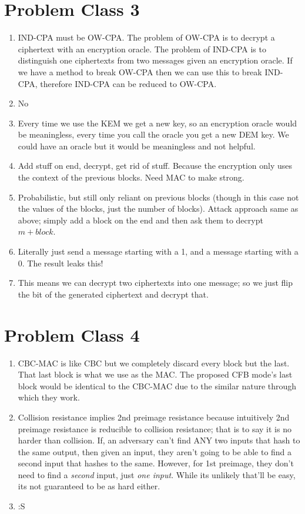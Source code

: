 \section{Problem Class 3}
	\begin{enumerate}
		\item IND-CPA must be OW-CPA. The problem of OW-CPA is to decrypt a ciphertext with an encryption oracle. The problem of IND-CPA is to distinguish one ciphertexts from two messages given an encryption oracle. If we have a method to break OW-CPA then we can use this to break IND-CPA, therefore IND-CPA can be reduced to OW-CPA.
		\item No
		\item Every time we use the KEM we get a new key, so an encryption oracle would be meaningless, every time you call the oracle you get a new DEM key. We could have an oracle but it would be meaningless and not helpful.

		\item Add stuff on end, decrypt, get rid of stuff. Because the encryption only uses the context of the previous blocks. Need MAC to make strong.
		\item Probabilistic, but still only reliant on previous blocks (though in this case not the values of the blocks, just the number of blocks). Attack approach same as above; simply add a block on the end and then ask them to decrypt $m+block$.
		\item Literally just send a message starting with a 1, and a message starting with a 0. The result leaks this!
		\item This means we can decrypt two ciphertexts into one message; so we just flip the bit of the generated ciphertext and decrypt that.
	\end{enumerate}

\section{Problem Class 4}
	\begin{enumerate}
		\item CBC-MAC is like CBC but we completely discard every block but the last. That last block is what we use as the MAC. The proposed CFB mode's last block would be identical to the CBC-MAC due to the similar nature through which they work.
		\item Collision resistance implies 2nd preimage resistance because intuitively 2nd preimage resistance is reducible to collision resistance; that is to say it is no harder than collision. If, an adversary can't find ANY two inputs that hash to the same output, then given an input, they aren't going to be able to find a second input that hashes to the same. However, for 1st preimage, they don't need to find a \textit{second} input, just \textit{one input}. While its unlikely that'll be easy, its not guaranteed to be as hard either.
		\item :S
	\end{enumerate}

